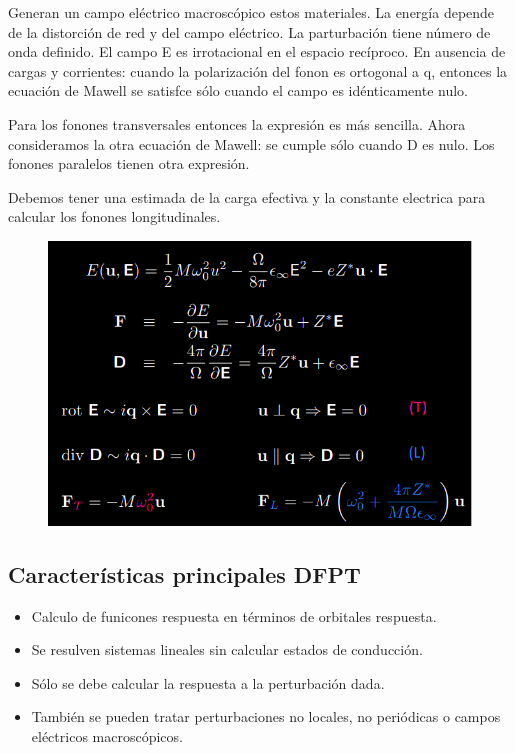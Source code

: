  Generan un campo eléctrico macroscópico estos materiales. La energía depende de la distorción de red y del campo eléctrico. La parturbación tiene número de onda definido. El campo E es irrotacional en el espacio recíproco. En ausencia de cargas y corrientes: cuando la polarización del fonon es ortogonal a q, entonces la ecuación de Mawell se satisfce sólo cuando el campo es idénticamente nulo.

  Para los fonones transversales entonces la expresión es más sencilla. Ahora consideramos la otra ecuación de Mawell: se cumple sólo cuando D es nulo. Los fonones paralelos tienen otra expresión.

  Debemos tener una estimada de la carga efectiva y la constante electrica para calcular los fonones longitudinales.

  \begin{figure}[H]
    \centering
    \includegraphics[scale = 0.6]{figs/D5/fonones_polares.png}
  \end{figure}

\subsection{Características principales DFPT}

  \begin{itemize}
    \item Calculo de funicones respuesta en términos de orbitales respuesta.
    \item Se resulven sistemas lineales sin calcular estados de conducción.
    \item Sólo se debe calcular la respuesta a la perturbación dada.
    \item También se pueden tratar perturbaciones no locales, no periódicas o campos eléctricos macroscópicos.
  \end{itemize}


